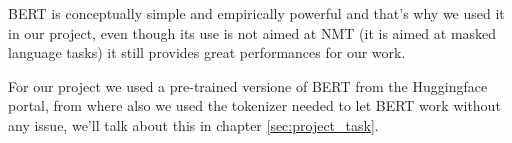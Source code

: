 BERT is conceptually simple and empirically powerful and that's why we used it in our project, even though its use is not aimed at NMT (it is aimed at masked language tasks) it still provides great performances for our work.
\vspace{3mm}

For our project we used a pre-trained versione of BERT from the Huggingface portal, from where also we used the tokenizer needed to let BERT work without any issue, we'll talk about this in chapter \ref{sec:project_task}.